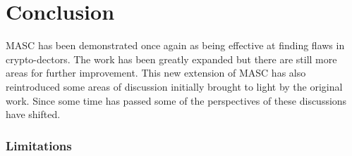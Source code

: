 \chapter{Conclusion}
\label{chap_conclusion}

MASC has been demonstrated once again as being effective at finding flaws in crypto-dectors. The work has been greatly expanded but there are still more areas for further improvement. This new extension of MASC has also reintroduced some areas of discussion initially brought to light by the original work. Since some time has passed some of the perspectives of these discussions have shifted.

\subsection{Limitations}
\label{ch6:sec:limitations}

